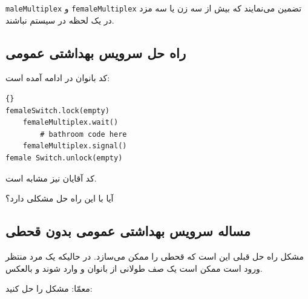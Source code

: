 \documentclass{book}
\newcommand{\clearemptydoublepage}{\newpage\cleardoublepage}
\begin{document}
    {\tt maleMultiplex} و {\tt femaleMultiplex}  
    تضمین می‌نمایند که بیش از سه زن یا سه مزد در یک لحظه در سیستم نباشند. 


\clearemptydoublepage
\subsection{راه حل سرویس بهداشتی عمومی}

    کد بانوان در ادامه آمده است: 

\begin{latin}
\begin{lstlisting}[title=\rl{راه حل سرویس بهداشتی عمومی (بانوان)}]{}
femaleSwitch.lock(empty)
    femaleMultiplex.wait()
        # bathroom code here
    femaleMultiplex.signal()
female Switch.unlock(empty)
\end{lstlisting}
\end{latin}

    کد آقایان نیز مشابه است. 

    آیا با این راه حل مشکلی دارد؟

\clearemptydoublepage
\subsection{مساله سرویس بهداشتی عمومی بدون قحطی}

    مشکل راه حل قبلی این است که قحطی را ممکن می‌سازد. در حالیکه یک مرد منتظر ورود است  ممکن است یک صف طولانی از بانوان و وارد شوند و بالعکس. 

    معمّا: مشکل را حل کنید: 


\clearemptydoublepage
\end{document}
